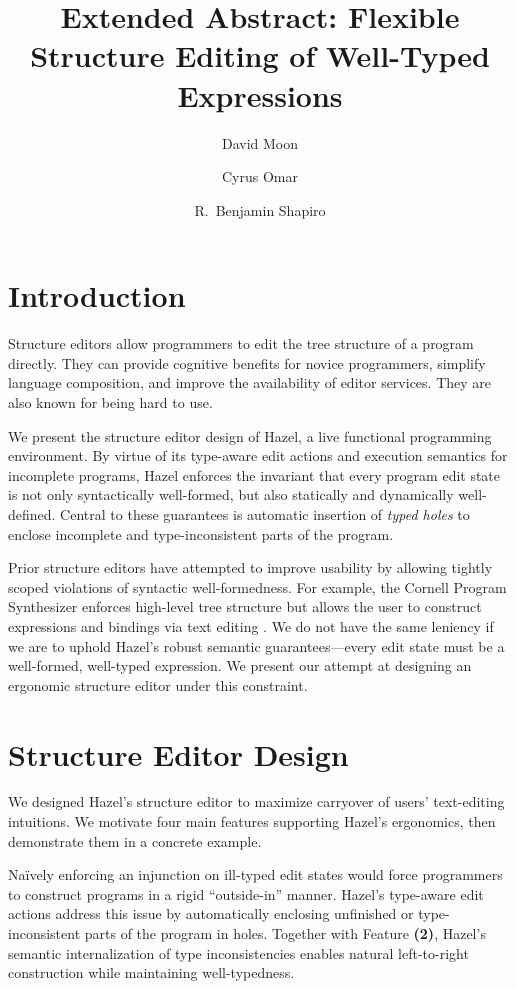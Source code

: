 \documentclass[format=sigplan,dvipsnames,backend=bibtex]{acmart}
\title{Extended Abstract: Flexible Structure Editing of Well-Typed Expressions}
\author{David Moon}
\affiliation{University of Colorado Boulder}
\author{Cyrus Omar}
\affiliation{University of Chicago}
\author{R.~Benjamin Shapiro}
\affiliation{University of Colorado Boulder}
\newcommand{\Hazel}{\textsf{Hazel}\xspace}
\begin{document}
\maketitle

\section{Introduction}

Structure editors allow programmers to edit the tree structure of a program directly.
They can provide cognitive benefits for novice programmers, simplify language composition,
  and improve the availability of editor services.
They are also known for being hard to use.

We present the structure editor design of \Hazel, a live functional programming environment.
By virtue of its type-aware edit actions and execution semantics for incomplete programs, 
	\Hazel enforces the invariant that every program edit state is not only syntactically 
	well-formed, but also statically \cite{Hazelnut} and dynamically \cite{HazelnutLive}
	well-defined.
Central to these guarantees is automatic insertion of \emph{typed holes} to enclose
	incomplete and type-inconsistent parts of the program.
	
Prior structure editors have attempted to improve usability by allowing tightly scoped 
	violations of syntactic well-formedness.
For example, the Cornell Program Synthesizer enforces high-level tree structure but
	allows the user to construct expressions and bindings via text editing \cite{Cornell}.
We do not have the same leniency if we are to uphold \Hazel's robust semantic
	guarantees---every edit state must be a well-formed, well-typed expression.
We present our attempt at designing an ergonomic structure editor under this constraint.
	
\section{Structure Editor Design}

We designed \Hazel's structure
	editor to maximize carryover of users' text-editing intuitions.
We motivate four main features supporting \Hazel's ergonomics, then demonstrate them
	in a concrete example.
	
\newcommand{\feat}[1]{{\bfseries (#1)}}

Naïvely enforcing an injunction on ill-typed edit states would force programmers to
	construct programs in a rigid ``outside-in'' manner.
\Hazel's type-aware edit actions address this issue by automatically enclosing unfinished
	or type-inconsistent parts of the program in holes.
Together with Feature \feat{2}, \Hazel's semantic internalization of type inconsistencies 
	enables natural left-to-right construction while maintaining well-typedness.
\end{document}
